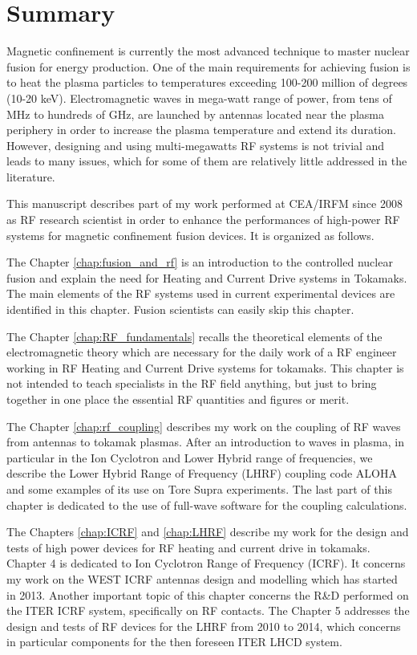 \chapter*{Summary}

Magnetic confinement is currently the most advanced technique to master nuclear fusion for energy production. One of the main requirements for achieving fusion is to heat the plasma particles to temperatures exceeding 100-200 million of degrees (10-20 keV). Electromagnetic waves in mega-watt range of power, from tens of MHz to hundreds of GHz, are launched by antennas located near the plasma periphery in order to increase the plasma temperature and extend its duration. However, designing and using multi-megawatts RF systems is not trivial and leads to many issues, which for some of them  are relatively little addressed in the literature. 

This manuscript describes part of my work performed at CEA/IRFM since 2008 as RF research scientist in order to enhance the performances of high-power RF systems for magnetic confinement fusion devices. It is organized as follows. 

The Chapter \ref{chap:fusion_and_rf} is an introduction to the controlled nuclear fusion and explain the need for Heating and Current Drive systems in Tokamaks. The main elements of the RF systems used in current experimental devices are identified in this chapter. Fusion scientists can easily skip this chapter. 

The Chapter \ref{chap:RF_fundamentals} recalls the theoretical elements of the electromagnetic theory which are necessary for the daily work of a RF engineer working in RF Heating and Current Drive systems for tokamaks. This chapter is not intended to teach specialists in the RF field anything, but just to bring together in one place the essential RF quantities and figures or merit. 

The Chapter \ref{chap:rf_coupling} describes my work on the coupling of RF waves from antennas to tokamak plasmas. After an introduction to waves in plasma, in particular in the Ion Cyclotron and Lower Hybrid range of frequencies, we describe the Lower Hybrid Range of Frequency (LHRF) coupling code ALOHA and some examples of its use on Tore Supra experiments. The last part of this chapter is dedicated to the use of full-wave software for the coupling calculations.

The Chapters \ref{chap:ICRF} and \ref{chap:LHRF} describe my work for the design and tests of high power devices for RF heating and current drive in tokamaks. Chapter 4 is dedicated to Ion Cyclotron Range of Frequency (ICRF). It concerns my work on the WEST ICRF antennas design and modelling which has started in 2013. Another important topic of this chapter concerns the R\&D performed on the ITER ICRF system, specifically on RF contacts. The Chapter 5 addresses the design and tests of RF devices for the LHRF from 2010 to 2014, which concerns in particular components for the then foreseen ITER LHCD system.

